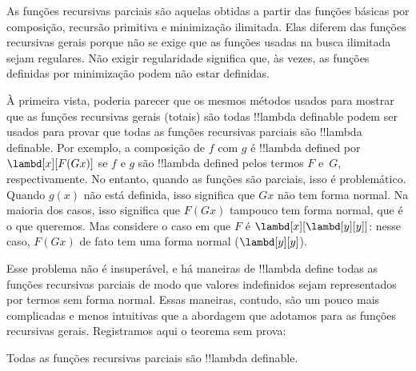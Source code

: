 \documentclass[../../../include/open-logic-section]{subfiles}
\begin{document}

As funções recursivas parciais são aquelas obtidas a partir das funções
básicas por composição, recursão primitiva e minimização
ilimitada. Elas diferem das funções recursivas gerais porque não se
exige que as funções usadas na busca ilimitada sejam regulares.
Não exigir regularidade significa que, às vezes, as funções definidas por minimização
podem não estar definidas. 

À primeira vista, poderia parecer que os mesmos métodos usados para mostrar que
as funções recursivas gerais (totais) são todas !!{lambda definable} podem
ser usados para provar que todas as funções recursivas parciais são
!!{lambda definable}. Por exemplo, a composição de $f$ com $g$ é
!!{lambda define}d por $\lambd[x][F (G x)]$ se $f$ e $g$ são
!!{lambda define}d pelos termos $F$ e~$G$, respectivamente. No entanto, quando as
funções são parciais, isso é problemático. Quando $g(x)$ não está definida,
isso significa que $G x$ não tem forma normal. Na maioria dos casos, isso significa que $F (G
x)$ tampouco tem forma normal, que é o que queremos. Mas considere
o caso em que $F$ é $\lambd[x][\lambd[y][y]]$: nesse caso, $F (G x)$ de fato
tem uma forma normal ($\lambd[y][y]$). 

Esse problema não é insuperável, e há maneiras de
!!{lambda define} todas as funções recursivas parciais de modo que
valores indefinidos sejam representados por termos sem forma normal.
Essas maneiras, contudo, são um pouco mais complicadas e menos intuitivas
que a abordagem que adotamos para as funções recursivas gerais. Registramos
aqui o teorema sem prova:

\begin{thm}
  Todas as funções recursivas parciais são !!{lambda definable}.
\end{thm}
\end{document}
